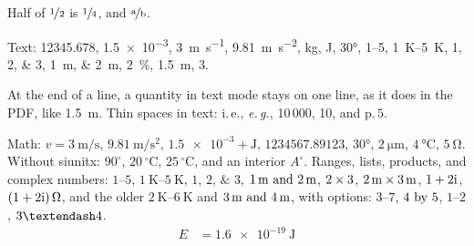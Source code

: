 \documentclass{article}
\begin{document}
Half of $\nicefrac{1}{2}$ is $\sfrac{1}{4}$, and $\nicefrac[\mathrm]{a}{b}$.

Text: \num{12345.678}, \num{1.5e-3}, \SI{3}{\meter\per\second},
\qty{9.81}{\metre\per\square\second}, \si{\kilo\gram}, \unit{\joule},
\ang{30}, \numrange{1}{5}, \qtyrange{1}{5}{\kelvin}, \numlist{1;2;3},
\qtylist{1;2}{\metre}, \qty{2}{\percent},
{\qty{1.5}{\metre}}, \qty{3}{\pct}.

At the end of a line, a quantity in text mode stays on one line, as it
does in the PDF, like {\qty{1.5}{\metre}}. Thin
spaces in text: i.\,e., \textit{e.\,g.}, 10\,000, 10, and
p.\,$5$.

Math: $v = \SI{3}{\meter\per\second}$, $\qty[per-mode=fraction]{9.81}{\metre\per\square\second}$,
$\num{1.5e-3} + \unit{\joule}$, $\num{1234567.89123}$, $\ang{30}$,
$\qty{2}{\micro\metre}$, $\qty{4}{\degreeCelsius}$, $\qty{5}{\ohm}$.
Without siunitx: $90^\circ$, $20\,{}^\circ\mathrm{C}$, $25\,^\circ\mathrm{C}$, and an interior $A^\circ$.
Ranges, lists, products, and complex numbers: $\numrange{1}{5}$,
$\qtyrange{1}{5}{\kelvin}$, $\numlist{1;2;3}$, $\qtylist{1;2}{\metre}$,
$\numproduct{2 x 3}$, $\qtyproduct{2 x 3}{\metre}$, $\complexnum{1+2i}$,
$\complexqty{1+2i}{\ohm}$, and the older
$\SIrange{2}{6}{\kelvin}$ and $\SIlist{3;4}{\metre}$, with options:
$\numrange[range-phrase={\ \text{through}\ }]{3}{7}$,
$\numproduct[product-mode=phrase]{4 x 5}$, $\numrange[range-phrase=--]{1}{2}$,
$\numrange[range-phrase=\textendash]{3}{4}$.
\begin{align}
  E &= \qty{1.6e-19}{\joule}
\end{align}
\end{document}
